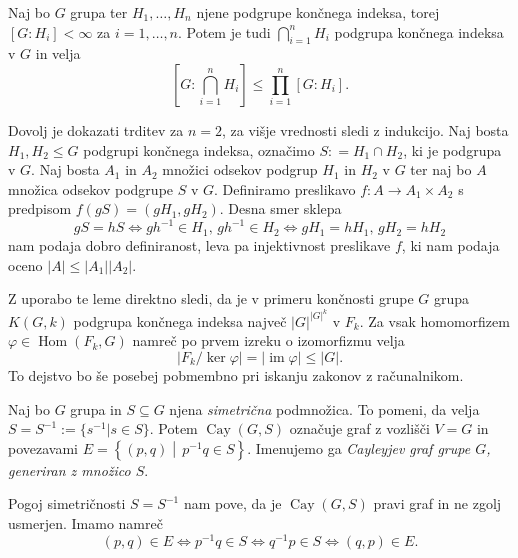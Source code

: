\begin{lema}\label{lem_koncni_indeks_koncnega_preseka}
Naj bo $G$ grupa ter $H_1, \ldots, H_n$ njene podgrupe končnega indeksa, torej $[G: H_i] < \infty$ za $i = 1, \ldots, n$. Potem je tudi $\bigcap_{i = 1}^{n} H_i$ podgrupa končnega indeksa v $G$ in velja
\begin{equation*}
\left[ G: \bigcap_{i = 1}^{n} H_i \right]  \le \prod_{i=1}^{n} [G: H_i].  
\end{equation*} 
\end{lema}

\begin{dokaz}
Dovolj je dokazati trditev za $n = 2$, za višje vrednosti sledi z indukcijo. Naj bosta $H_1, H_2 \le G$ podgrupi končnega indeksa, označimo $S: = H_1 \cap H_2$, ki je podgrupa v $G$. Naj bosta $A_1$ in $A_2$ množici odsekov podgrup $H_1$ in $H_2$ v $G$ ter naj bo $A$ množica odsekov podgrupe $S$ v $G$.
 Definiramo preslikavo $f : A \to  A_1 \times A_2$ s predpisom $f(g S ) = (g H_1, g H_2)$. Desna smer sklepa \begin{equation*}
 g S = h S \iff gh^{-1} \in H_1, \, gh^{-1} \in H_2  \iff g H_1 = h H_1, \, g H_2 = h H_2
\end{equation*}  
nam podaja dobro definiranost, leva pa injektivnost preslikave $f$, ki nam podaja oceno $\lvert A \rvert \le  \lvert A_1 \rvert \lvert A_2 \rvert $.    
\end{dokaz}
Z uporabo te leme direktno sledi, da je v primeru končnosti grupe $G$ grupa $K(G, k)$ podgrupa končnega indeksa največ $\lvert G \rvert^{ \lvert G \rvert^k}$ v $F_k$. 
Za vsak homomorfizem $\varphi \in \operatorname{Hom}(F_k, G)$ namreč po prvem izreku o izomorfizmu velja \begin{equation*}
    \lvert F_k / \ker \varphi \rvert = \lvert \operatorname{im} \varphi \rvert \le \lvert G \rvert. 
\end{equation*}
To dejstvo bo še posebej pobmembno pri iskanju zakonov z računalnikom.


\begin{definicija}
\label{def_cayleyev_graf}
Naj bo $G$ grupa in $S \subseteq G$ njena \emph{simetrična} podmnožica. To pomeni, da velja $S = S^{-1} := \{ s^{-1}  \vert s \in S  \}$. Potem $\operatorname{Cay}(G, S)$ označuje graf z vozlišči $V = G$ in povezavami
$E = \left\{ (p, q) \middle|\, p^{-1}q \in  S \right\}$. Imenujemo ga \emph{Cayleyjev graf grupe $G$, generiran z množico $S$}.  
\end{definicija}

\begin{opomba}
Pogoj simetričnosti $S = S^{-1}$ nam pove, da je $\operatorname{Cay}(G, S)$ pravi graf in ne zgolj usmerjen. Imamo namreč \begin{equation*}
(p,q) \in  E \iff p^{-1}q \in S \iff q^{-1}p \in S \iff (q,p) \in  E.
\end{equation*}  
\end{opomba}

